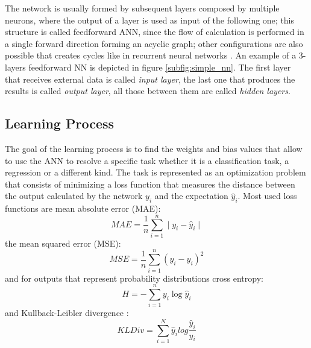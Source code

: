 The network is usually formed by subsequent layers composed by multiple neurons, where the output of a layer is used as input of the following one; this structure is called feedforward ANN, since the flow of calculation is performed in a single forward direction forming an acyclic graph; other configurations are also possible that creates cycles like in recurrent neural networks \cite{lstm1997}.
An example of a 3-layers feedforward NN is depicted in figure \ref{subfig:simple_nn}. The first layer that receives external data is called \emph{input layer}, the last one that produces the results is called \emph{output layer}, all those between them are called \emph{hidden layers}.


\subsection{Learning Process} \label{sec:learning_process}
The goal of the learning process is to find the weights and bias values that allow to use the ANN to resolve a specific task whether it is a classification task, a regression or a different kind.
The task is represented as an optimization problem that consists of minimizing a loss function that measures the distance between the output calculated by the network $y_i$ and the expectation $\hat{y}_i$.
Most used loss functions are mean absolute error (MAE):
\begin{equation}
    MAE = \frac{1}{n} \sum\limits_{i=1}^n \mid y_i - \hat{y}_i \mid
    \label{eqn:mae}
\end{equation}
the mean squared error (MSE):
\begin{equation}
    MSE = \frac{1}{n} \sum\limits_{i=1}^n (y_i - \hat{y}_i)^2
    \label{eqn:mse}
\end{equation}
and for outputs that represent probability distributions cross entropy:
\begin{equation}
    H = - \sum\limits_{i=1}^n y_i \log \hat{y}_i
    \label{eqn:cross_entropy}
\end{equation}
and Kullback-Leibler divergence \cite{Kullback1951}:
\begin{equation}
    KLDiv = \sum_{i=1}^{N} \hat{y}_i log\frac{\hat{y}_i}{y{_i}}
    \label{eqn:kldiv}
\end{equation}

